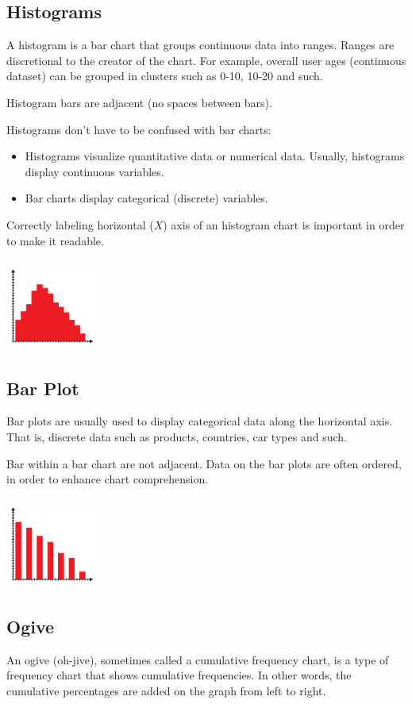 \documentclass{article}
\begin{document}
\subsection{Histograms}
A histogram is a bar chart that groups continuous data into ranges. Ranges are discretional to the creator of the chart. For example, overall user ages (continuous dataset) can be grouped in clusters such as 0-10, 10-20 and such.

Histogram bars are adjacent (no spaces between bars).

Histograms don’t have to be confused with bar charts:
\begin{itemize}
    \item Histograms visualize quantitative data or numerical data. Usually, histograms display continuous variables. 
    \item Bar charts display categorical (discrete) variables. 
\end{itemize}

Correctly labeling horizontal ($X$) axis of an histogram chart is important in order to make it readable.

\includegraphics[width=3cm, height=3cm]{histogram_chart}

\subsection{Bar Plot}
Bar plots are usually used to display categorical data along the horizontal axis. That is, discrete data such as products, countries, car types and such. 

Bar within a bar chart are not adjacent. Data on the bar plots are often ordered, in order to enhance chart comprehension. 

\includegraphics[width=3cm, height=3cm]{bar_chart}

\subsection{Ogive}
An ogive (oh-jive), sometimes called a cumulative frequency chart, is a type of frequency chart that shows cumulative frequencies. In other words, the cumulative percentages are added on the graph from left to right.
\end{document}
